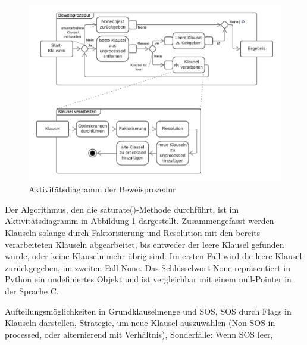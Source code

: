 \begin{figure}
	\centering
	\includegraphics[width=1\linewidth]{images/Lucid/ActivityProof}
	\caption{Aktivitätsdiagramm der Beweisprozedur}
	\label{fig:activityproof}
\end{figure}


Der Algorithmus, den die saturate()-Methode durchführt, ist im Aktivitätsdiagramm in Abbildung \ref{fig:activityproof} dargestellt. Zusammengefasst werden Klauseln solange durch Faktorisierung und Resolution mit den bereits verarbeiteten Klauseln abgearbeitet, bis entweder der leere Klausel gefunden wurde, oder keine Klauseln mehr übrig sind.
Im ersten Fall wird die leere Klausel zurückgegeben, im zweiten Fall None. Das Schlüsselwort None repräsentiert in Python ein undefiniertes Objekt und ist vergleichbar mit einem null-Pointer in der Sprache C.

Aufteilungsmöglichkeiten in Grundklauselmenge und SOS, SOS durch Flags in Klauseln darstellen, Strategie, um neue Klausel auszuwählen (Non-SOS in processed, oder alternierend mit Verhältnis),
Sonderfälle: Wenn SOS leer, 